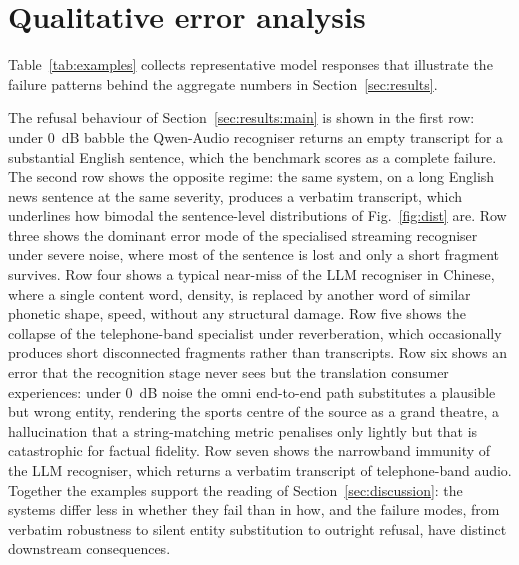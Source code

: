 \section{Qualitative error analysis}
\label{app:qualitative}

Table~\ref{tab:examples} collects representative model responses that
illustrate the failure patterns behind the aggregate numbers in
Section~\ref{sec:results}.

The refusal behaviour of Section~\ref{sec:results:main} is shown in the
first row: under 0~dB babble the Qwen-Audio recogniser returns an empty
transcript for a substantial English sentence, which the benchmark scores as
a complete failure. The second row shows the opposite regime: the same
system, on a long English news sentence at the same severity, produces a
verbatim transcript, which underlines how bimodal the sentence-level
distributions of Fig.~\ref{fig:dist} are. Row three shows the dominant error
mode of the specialised streaming recogniser under severe noise, where most
of the sentence is lost and only a short fragment survives. Row four shows a
typical near-miss of the LLM recogniser in Chinese, where a single
content word, density, is replaced by another word of similar phonetic
shape, speed, without any structural damage. Row five shows the collapse of
the telephone-band specialist under reverberation, which occasionally
produces short disconnected fragments rather than transcripts. Row six
shows an error that the recognition stage never sees but the translation
consumer experiences: under 0~dB noise the omni end-to-end path substitutes
a plausible but wrong entity, rendering the sports centre of the source as a
grand theatre, a hallucination that a string-matching metric penalises only
lightly but that is catastrophic for factual fidelity. Row seven shows the
narrowband immunity of the LLM recogniser, which returns a verbatim
transcript of telephone-band audio. Together the examples support the
reading of Section~\ref{sec:discussion}: the systems differ less in whether
they fail than in how, and the failure modes, from verbatim robustness to
silent entity substitution to outright refusal, have distinct downstream
consequences.

